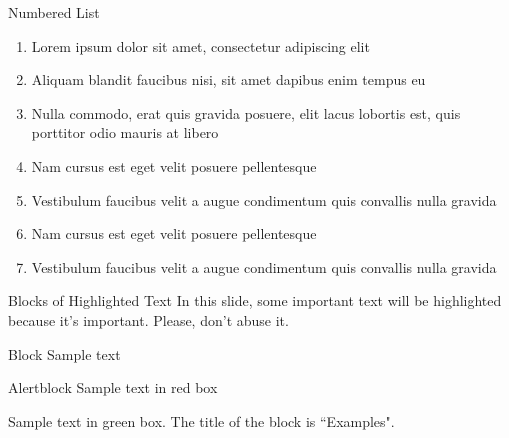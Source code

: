 \documentclass[aspectratio=169,xcolor=dvipsnames, t]{beamer}
\begin{document}
\begin{frame}{Numbered List}
    \begin{enumerate}
        \item Lorem ipsum dolor sit amet, consectetur adipiscing elit
        \item Aliquam blandit faucibus nisi, sit amet dapibus enim tempus eu
        \item Nulla commodo, erat quis gravida posuere, elit lacus lobortis est, quis porttitor odio mauris at libero
        \item Nam cursus est eget velit posuere pellentesque
        \item Vestibulum faucibus velit a augue condimentum quis convallis nulla gravida
        \item Nam cursus est eget velit posuere pellentesque
        \item Vestibulum faucibus velit a augue condimentum quis convallis nulla gravida
    \end{enumerate}
\end{frame}

\begin{frame}{Blocks of Highlighted Text}
    In this slide, some important text will be \alert{highlighted} because it's important. Please, don't abuse it.

    \begin{block}{Block}
        Sample text
    \end{block}

    \begin{alertblock}{Alertblock}
        Sample text in red box
    \end{alertblock}

    \begin{examples}
        Sample text in green box. The title of the block is ``Examples".
    \end{examples}
\end{frame}
\end{document}
